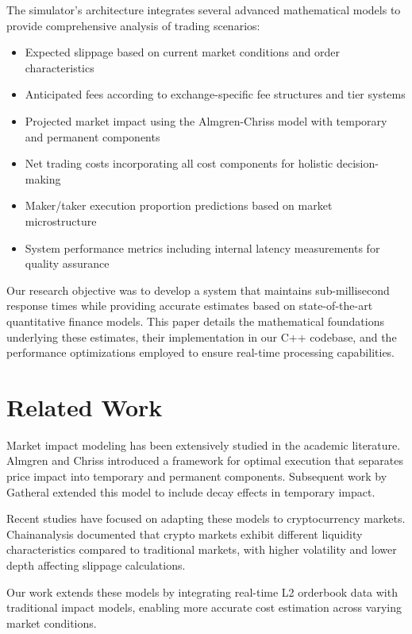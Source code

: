 \documentclass[10pt,twocolumn,a4paper]{IEEEtran}
\begin{document}
The simulator's architecture integrates several advanced mathematical models to provide comprehensive analysis of trading scenarios:

\begin{itemize}
    \item Expected slippage based on current market conditions and order characteristics
    \item Anticipated fees according to exchange-specific fee structures and tier systems
    \item Projected market impact using the Almgren-Chriss model with temporary and permanent components
    \item Net trading costs incorporating all cost components for holistic decision-making
    \item Maker/taker execution proportion predictions based on market microstructure
    \item System performance metrics including internal latency measurements for quality assurance
\end{itemize}

Our research objective was to develop a system that maintains sub-millisecond response times while providing accurate estimates based on state-of-the-art quantitative finance models. This paper details the mathematical foundations underlying these estimates, their implementation in our C++ codebase, and the performance optimizations employed to ensure real-time processing capabilities.

\section{Related Work}

Market impact modeling has been extensively studied in the academic literature. Almgren and Chriss \cite{almgren2001} introduced a framework for optimal execution that separates price impact into temporary and permanent components. Subsequent work by Gatheral \cite{gatheral2010} extended this model to include decay effects in temporary impact.

Recent studies have focused on adapting these models to cryptocurrency markets. Chainanalysis \cite{chain2022} documented that crypto markets exhibit different liquidity characteristics compared to traditional markets, with higher volatility and lower depth affecting slippage calculations.

Our work extends these models by integrating real-time L2 orderbook data with traditional impact models, enabling more accurate cost estimation across varying market conditions.
\end{document}

